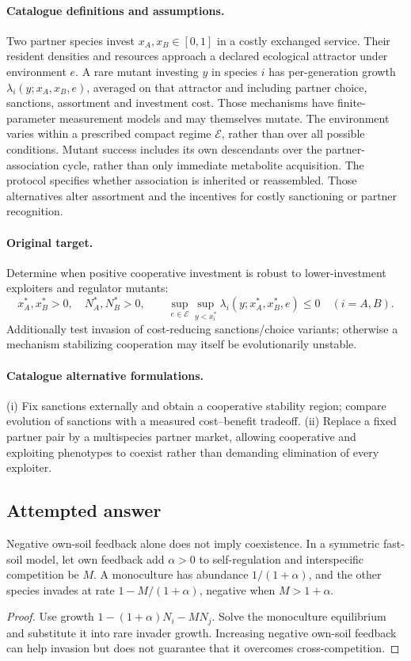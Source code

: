 \documentclass[11pt]{article}
\begin{document}
\paragraph{Catalogue definitions and assumptions.}
Two partner species invest $x_A,x_B\in[0,1]$ in a costly exchanged service. Their resident densities and resources approach a declared ecological attractor under environment $e$. A rare mutant investing $y$ in species $i$ has per-generation growth $\lambda_i(y;x_A,x_B,e)$, averaged on that attractor and including partner choice, sanctions, assortment and investment cost. Those mechanisms have finite-parameter measurement models and may themselves mutate. The environment varies within a prescribed compact regime $\mathcal E$, rather than over all possible conditions. Mutant success includes its own descendants over the partner-association cycle, rather than only immediate metabolite acquisition. The protocol specifies whether association is inherited or reassembled. Those alternatives alter assortment and the incentives for costly sanctioning or partner recognition.
\paragraph{Original target.}
Determine when positive cooperative investment is robust to lower-investment exploiters and regulator mutants:
\[
 x_A^*,x_B^*>0,\quad N_A^*,N_B^*>0,\qquad
 \sup_{e\in\mathcal E}\sup_{y<x_i^*}
 \lambda_i(y;x_A^*,x_B^*,e)\le0\quad(i=A,B).
\]
Additionally test invasion of cost-reducing sanctions/choice variants; otherwise a mechanism stabilizing cooperation may itself be evolutionarily unstable.
\paragraph{Catalogue alternative formulations.}
(i) Fix sanctions externally and obtain a cooperative stability region; compare evolution of sanctions with a measured cost--benefit tradeoff. (ii) Replace a fixed partner pair by a multispecies partner market, allowing cooperative and exploiting phenotypes to coexist rather than demanding elimination of every exploiter.
\subsection{Attempted answer}
\begin{proposition}
Negative own-soil feedback alone does not imply coexistence. In a symmetric fast-soil model, let own feedback add $\alpha>0$ to self-regulation and interspecific competition be $M$. A monoculture has abundance $1/(1+\alpha)$, and the other species invades at rate $1-M/(1+\alpha)$, negative when $M>1+\alpha$.
\end{proposition}
\begin{proof}
Use growth $1-(1+\alpha)N_i-MN_j$. Solve the monoculture equilibrium and substitute it into rare invader growth. Increasing negative own-soil feedback can help invasion but does not guarantee that it overcomes cross-competition.
\end{proof}
\end{document}
